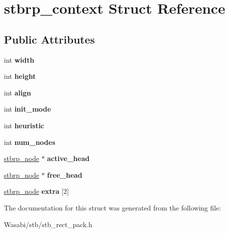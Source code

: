 \hypertarget{structstbrp__context}{}\section{stbrp\+\_\+context Struct Reference}
\label{structstbrp__context}
\subsection*{Public Attributes}
\begin{DoxyCompactItemize}
\item 
int {\bfseries width}\hypertarget{structstbrp__context_a70cfcb2044ce8397cc440d28b30c09b2}{}\label{structstbrp__context_a70cfcb2044ce8397cc440d28b30c09b2}

\item 
int {\bfseries height}\hypertarget{structstbrp__context_af3715a6f3faecfb4fac8f6ccbb71f9c7}{}\label{structstbrp__context_af3715a6f3faecfb4fac8f6ccbb71f9c7}

\item 
int {\bfseries align}\hypertarget{structstbrp__context_ae36053e2001a725aec2b5756dc990481}{}\label{structstbrp__context_ae36053e2001a725aec2b5756dc990481}

\item 
int {\bfseries init\+\_\+mode}\hypertarget{structstbrp__context_a007509feee322404083034e4c2d3dc5d}{}\label{structstbrp__context_a007509feee322404083034e4c2d3dc5d}

\item 
int {\bfseries heuristic}\hypertarget{structstbrp__context_a4b61a7f94e50a54c075e2a8f99f6503a}{}\label{structstbrp__context_a4b61a7f94e50a54c075e2a8f99f6503a}

\item 
int {\bfseries num\+\_\+nodes}\hypertarget{structstbrp__context_afa8105d4ef6d3e0ae5aaf8e1ed4b2c58}{}\label{structstbrp__context_afa8105d4ef6d3e0ae5aaf8e1ed4b2c58}

\item 
\hyperlink{structstbrp__node}{stbrp\+\_\+node} $\ast$ {\bfseries active\+\_\+head}\hypertarget{structstbrp__context_a13277239636803aff28f00b0a0376120}{}\label{structstbrp__context_a13277239636803aff28f00b0a0376120}

\item 
\hyperlink{structstbrp__node}{stbrp\+\_\+node} $\ast$ {\bfseries free\+\_\+head}\hypertarget{structstbrp__context_a1336ae32373663847866cc65904c2839}{}\label{structstbrp__context_a1336ae32373663847866cc65904c2839}

\item 
\hyperlink{structstbrp__node}{stbrp\+\_\+node} {\bfseries extra} \mbox{[}2\mbox{]}\hypertarget{structstbrp__context_a0b80e1fbdac125427526f3500d4e7624}{}\label{structstbrp__context_a0b80e1fbdac125427526f3500d4e7624}

\end{DoxyCompactItemize}


The documentation for this struct was generated from the following file\+:\begin{DoxyCompactItemize}
\item 
Wasabi/stb/stb\+\_\+rect\+\_\+pack.\+h\end{DoxyCompactItemize}
